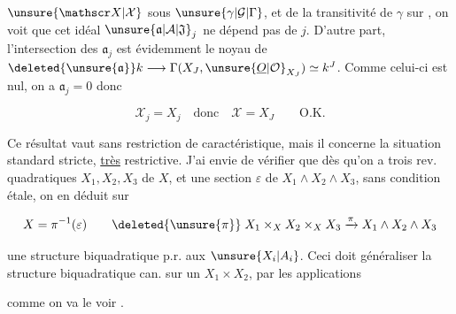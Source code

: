 
$\unsure{\mathscr X|\mathcal X}$ sous $\unsure{\gamma|\mathcal G|\Gamma}$, et de la transitivité de $\gamma$ sur , on voit que cet idéal $\unsure{\mathfrak a|\mathcal A|\mathfrak J}_j$ ne dépend pas de $j$. D'autre part, l'intersection des $\mathfrak a_j$ est évidemment le noyau de $\deleted{\unsure{\mathfrak a}}k\longrightarrow\Gamma(X_J,\unsure{\underline O|\mathcal O}_{X_J})\simeq k^J$. Comme celui-ci est nul, on a $\mathfrak a_j=0$ donc

\[
 \mathscr X_j=X_j\quad\text{donc}\quad\mathscr X=X_J\qquad\text{O.K.}
\]

Ce résultat vaut sans restriction de caractéristique, mais il concerne la situation standard stricte, \uline{très} restrictive. J'ai envie de vérifier que dès qu'on a trois rev. quadratiques $X_1,X_2,X_3$ de $X$, et une section $\varepsilon$ de $X_1\wedge X_2\wedge X_3$, sans condition étale, on en déduit sur

\[
 X=\pi^{-1}(\varepsilon)\qquad
 \deleted{\unsure{\pi}}\; X_1\times_X X_2\times_X X_3\xrightarrow{\pi}X_1\wedge X_2\wedge X_3
\]

une structure biquadratique p.r. aux $\unsure{X_i|A_i}$. Ceci doit généraliser la structure biquadratique can. sur un $X_1\times X_2$, par les applications


comme on va le voir .

